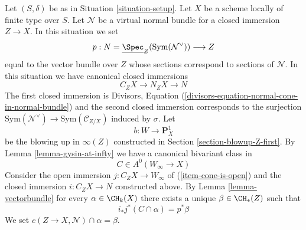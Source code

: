 \noindent
Let $(S, \delta)$ be as in Situation \ref{situation-setup}. Let $X$ be a scheme
locally of finite type over $S$. Let $\mathcal{N}$ be a virtual normal bundle
for a closed immersion $Z \to X$. In this situation we set
$$
p : N = \underline{\Spec}_Z(\text{Sym}(\mathcal{N}^\vee)) \longrightarrow Z
$$
equal to the vector bundle over $Z$
whose sections correspond to sections of $\mathcal{N}$.
In this situation we have canonical closed immersions
$$
C_ZX \longrightarrow N_ZX \longrightarrow N
$$
The first closed immersion is Divisors, Equation
(\ref{divisors-equation-normal-cone-in-normal-bundle})
and the second closed immersion corresponds to the surjection
$\text{Sym}(\mathcal{N}^\vee) \to \text{Sym}(\mathcal{C}_{Z/X})$
induced by $\sigma$.
Let
$$
b : W \longrightarrow \mathbf{P}^1_X
$$
be the blowing up in $\infty(Z)$ constructed in
Section \ref{section-blowup-Z-first}. By
Lemma \ref{lemma-gysin-at-infty}
we have a canonical bivariant class in
$$
C \in A^0(W_\infty \to X)
$$
Consider the open immersion $j : C_ZX \to W_\infty$ of
(\ref{item-cone-is-open}) and the closed immersion
$i : C_ZX \to N$ constructed above. By Lemma \ref{lemma-vectorbundle}
for every $\alpha \in \CH_k(X)$ there exists a unique
$\beta \in \CH_*(Z)$ such that
$$
i_*j^*(C \cap \alpha) = p^*\beta
$$
We set $c(Z \to X, \mathcal{N}) \cap \alpha = \beta$.
